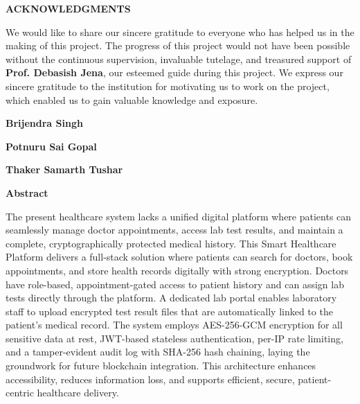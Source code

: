 \documentclass[a4paper,12pt]{report}
\begin{document}
\vspace*{2cm}
\begin{center}
    \textbf{\Large ACKNOWLEDGMENTS}
\end{center}
\vspace{1cm}
We would like to share our sincere gratitude to everyone who has helped us in the making of this project. The progress of this project would not have been possible without the continuous supervision, invaluable tutelage, and treasured support of \textbf{Prof. Debasish Jena}, our esteemed guide during this project. We express our sincere gratitude to the institution for motivating us to work on the project, which enabled us to gain valuable knowledge and exposure.
\vspace{2cm}
\begin{flushright}
    \textbf{Brijendra Singh}
\end{flushright}
\begin{flushright}
    \textbf{Potnuru Sai Gopal}
\end{flushright}
\begin{flushright}
    \textbf{Thaker Samarth Tushar}
\end{flushright}

\clearpage
\vspace*{5cm}
\begin{center}
    \textbf{\Large Abstract}
\end{center}
\vspace{1cm}
The present healthcare system lacks a unified digital platform where patients can seamlessly manage doctor appointments, access lab test results, and maintain a complete, cryptographically protected medical history. This Smart Healthcare Platform delivers a full-stack solution where patients can search for doctors, book appointments, and store health records digitally with strong encryption. Doctors have role-based, appointment-gated access to patient history and can assign lab tests directly through the platform. A dedicated lab portal enables laboratory staff to upload encrypted test result files that are automatically linked to the patient's medical record. The system employs AES-256-GCM encryption for all sensitive data at rest, JWT-based stateless authentication, per-IP rate limiting, and a tamper-evident audit log with SHA-256 hash chaining, laying the groundwork for future blockchain integration. This architecture enhances accessibility, reduces information loss, and supports efficient, secure, patient-centric healthcare delivery.
\end{document}
